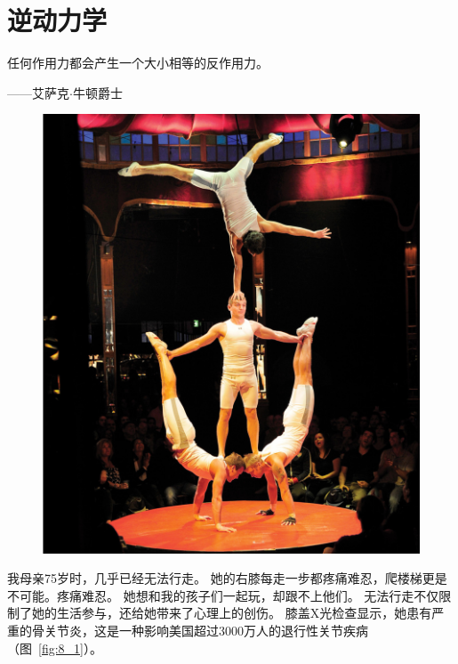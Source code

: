 \chapter{逆动力学} \label{chap:chap8}

任何作用力都会产生一个大小相等的反作用力。

\begin{flushright}
	——艾萨克$\cdot$牛顿爵士
\end{flushright}

\begin{figure}[!htb]
	\centering
	\includegraphics[width=1.0\linewidth]{chap8/8_0}
	\caption*{ \label{fig:8_0}}
\end{figure}


我母亲75岁时，几乎已经无法行走。
她的右膝每走一步都疼痛难忍，爬楼梯更是不可能。疼痛难忍。
她想和我的孩子们一起玩，却跟不上他们。
无法行走不仅限制了她的生活参与，还给她带来了心理上的创伤。
膝盖X光检查显示，她患有严重的骨关​​节炎，这是一种影响美国超过3000万人的退行性关节疾病（图~\ref{fig:8_1}）。



